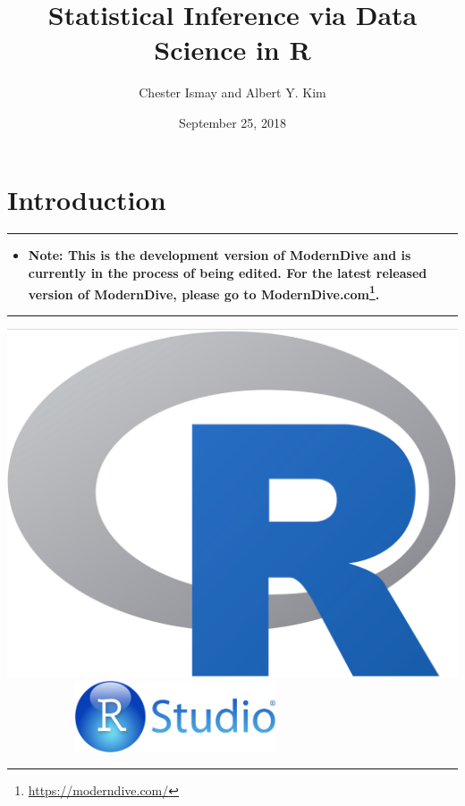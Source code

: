 \documentclass[12pt,]{krantz}
\title{Statistical Inference via Data Science in R}
\author{Chester Ismay and Albert Y. Kim}
\date{September 25, 2018}
\renewcommand{\href}[2]{#2\footnote{\url{#1}}}
\newenvironment{rmdblock}[1]
  {\begin{shaded*}
  \begin{itemize}
  \renewcommand{\labelitemi}{
    \raisebox{-.7\height}[0pt][0pt]{
    }
  }
  \item
  }
  {
  \end{itemize}
  \end{shaded*}
  }
\newenvironment{learncheck}
  {\begin{rmdblock}{warning}}
  {\end{rmdblock}}
\begin{document}
\maketitle


\thispagestyle{empty}

\begin{center}
\end{center}

\setlength{\abovedisplayskip}{-5pt}
\setlength{\abovedisplayshortskip}{-5pt}

{
\hypersetup{linkcolor=black}
\setcounter{tocdepth}{2}
\tableofcontents
}
\listoftables
\listoffigures
\mainmatter

\chapter{Introduction}\label{intro}

\begin{center}\rule{0.5\linewidth}{\linethickness}\end{center}

\begin{learncheck}
\textbf{Note: This is the development version of ModernDive and is
currently in the process of being edited. For the latest released
version of ModernDive, please go to
\href{https://moderndive.com/}{ModernDive.com}.}
\end{learncheck}

\begin{center}\rule{0.5\linewidth}{\linethickness}\end{center}

\includegraphics[height=0.20000\textwidth]{images/Rlogo.png} \hfill    
   
\includegraphics[width=0.45000\textwidth]{images/RStudio-Logo-Blue-Gradient.png}
\end{document}
